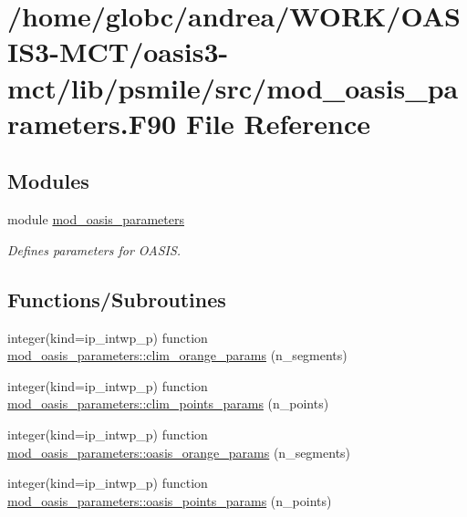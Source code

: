 \hypertarget{mod__oasis__parameters_8_f90}{}\section{/home/globc/andrea/\+W\+O\+R\+K/\+O\+A\+S\+I\+S3-\/\+M\+C\+T/oasis3-\/mct/lib/psmile/src/mod\+\_\+oasis\+\_\+parameters.F90 File Reference}
\label{mod__oasis__parameters_8_f90}
\subsection*{Modules}
\begin{DoxyCompactItemize}
\item 
module \hyperlink{namespacemod__oasis__parameters}{mod\+\_\+oasis\+\_\+parameters}
\begin{DoxyCompactList}\small\item\em Defines parameters for O\+A\+S\+IS. \end{DoxyCompactList}\end{DoxyCompactItemize}
\subsection*{Functions/\+Subroutines}
\begin{DoxyCompactItemize}
\item 
integer(kind=ip\+\_\+intwp\+\_\+p) function \hyperlink{namespacemod__oasis__parameters_abf6fb2dbeee19674bef02b0c1fc7dc2f}{mod\+\_\+oasis\+\_\+parameters\+::clim\+\_\+orange\+\_\+params} (n\+\_\+segments)
\item 
integer(kind=ip\+\_\+intwp\+\_\+p) function \hyperlink{namespacemod__oasis__parameters_a1f4f746e95fc0b05147aaa0b82a77a54}{mod\+\_\+oasis\+\_\+parameters\+::clim\+\_\+points\+\_\+params} (n\+\_\+points)
\item 
integer(kind=ip\+\_\+intwp\+\_\+p) function \hyperlink{namespacemod__oasis__parameters_a3f85c99a22ed2a7ac207c8f21c1a363c}{mod\+\_\+oasis\+\_\+parameters\+::oasis\+\_\+orange\+\_\+params} (n\+\_\+segments)
\item 
integer(kind=ip\+\_\+intwp\+\_\+p) function \hyperlink{namespacemod__oasis__parameters_a4fe64d20b93b278465a4842c6a844501}{mod\+\_\+oasis\+\_\+parameters\+::oasis\+\_\+points\+\_\+params} (n\+\_\+points)
\end{DoxyCompactItemize}
